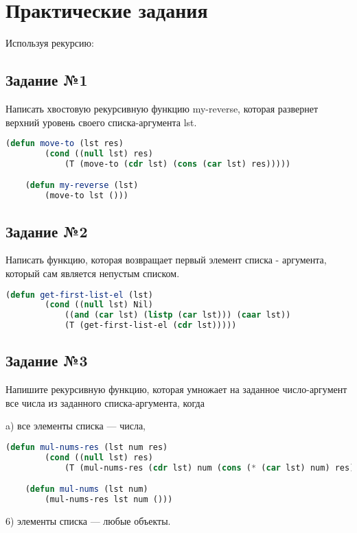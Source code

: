 \chapter{Практические задания}

Используя рекурсию:

\section{Задание №1}

Написать хвостовую рекурсивную функцию my-reverse, которая развернет верхний уровень своего списка-аргумента lst.

\begin{lstlisting}[language=Lisp]
	(defun move-to (lst res)
		(cond ((null lst) res)
			(T (move-to (cdr lst) (cons (car lst) res)))))

	(defun my-reverse (lst)
		(move-to lst ()))
\end{lstlisting}

\section{Задание №2}

Написать функцию, которая возвращает первый элемент списка - аргумента, который сам является непустым списком.

\begin{lstlisting}[language=Lisp]
	 (defun get-first-list-el (lst)
		(cond ((null lst) Nil)
			((and (car lst) (listp (car lst))) (caar lst))
			(T (get-first-list-el (cdr lst)))))
\end{lstlisting}

\section{Задание №3}

Напишите рекурсивную функцию, которая умножает на заданное число-аргумент все
числа из заданного списка-аргумента, когда

a) все элементы списка --- числа,

\begin{lstlisting}[language=Lisp]
	(defun mul-nums-res (lst num res)
		(cond ((null lst) res)
			(T (mul-nums-res (cdr lst) num (cons (* (car lst) num) res)))))

	(defun mul-nums (lst num)
		(mul-nums-res lst num ()))
\end{lstlisting}

6) элементы списка --- любые объекты.

